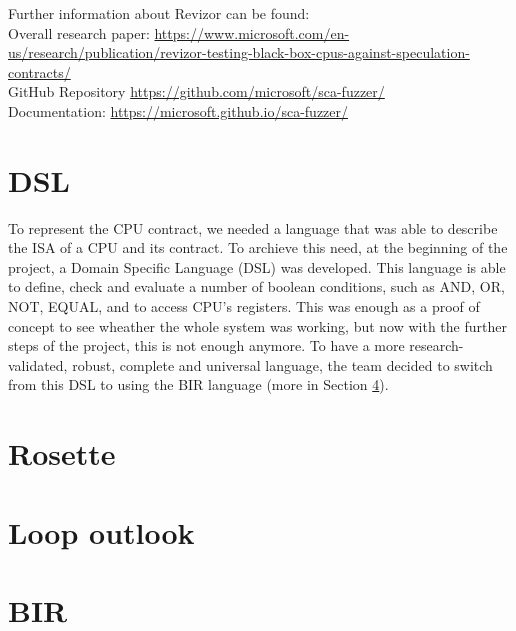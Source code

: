 Further information about Revizor can be found: \\ Overall research paper:
\url{https://www.microsoft.com/en-us/research/publication/revizor-testing-black-box-cpus-against-speculation-contracts/}
\\ GitHub Repository \url{https://github.com/microsoft/sca-fuzzer/} \\Documentation:
\url{https://microsoft.github.io/sca-fuzzer/}

\section{DSL}
\label{cha:DSL} To represent the CPU contract, we needed a language that was
able to describe the ISA of a CPU and its contract. To archieve this need, at
the beginning of the project, a Domain Specific Language (DSL) was developed.
This language is able to define, check and evaluate a number of boolean conditions,
such as AND, OR, NOT, EQUAL, and to access CPU's registers. This was enough as a
proof of concept to see wheather the whole system was working, but now with the
further steps of the project, this is not enough anymore. To have a more
research-validated, robust, complete and universal language, the team decided to
switch from this DSL to using the BIR language (more in Section \ref*{cha:BIR}).

\section{Rosette}
\label{cha:Rosette}

\section{Loop outlook}
\label{cha: Loop outlook}

\section{BIR}
\label{cha:BIR}